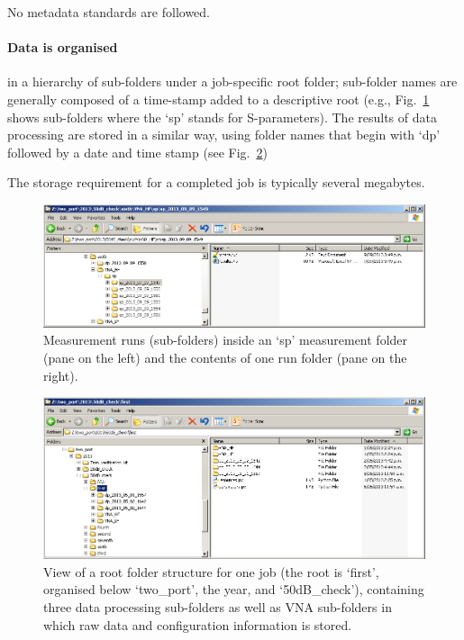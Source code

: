 No metadata standards are followed. 

\paragraph{Data is organised} in a hierarchy of sub-folders under a job-specific root folder; sub-folder names are generally composed of a time-stamp added to a descriptive root (e.g., Fig.~\ref{fig:runs} shows sub-folders where the `sp' stands for S-parameters). The results of data processing are stored in a similar way, using folder names that begin
with `dp' followed by a date and time stamp (see Fig.~\ref{fig:folders}) 

The storage requirement for a completed job is typically several megabytes.

\begin{figure}[ht]
 \centering
  \includegraphics[width=0.8\linewidth]{pictures/filesystem_vna_runs.png}
  \caption{Measurement runs (sub-folders) inside an `sp' measurement folder (pane on the left) and the contents of one run folder (pane on the right).}
  \label{fig:runs}
\end{figure}

\begin{figure}[ht]
 \centering
  \includegraphics[width=0.8\linewidth]{pictures/filesystem_runs.png}
  \caption{View of a root folder structure for one job (the root is `first', organised below `two\_port', the year, and `50dB\_check'), containing three data processing sub-folders as well as VNA sub-folders in which raw data and configuration information is stored.}
  \label{fig:folders}
\end{figure}

